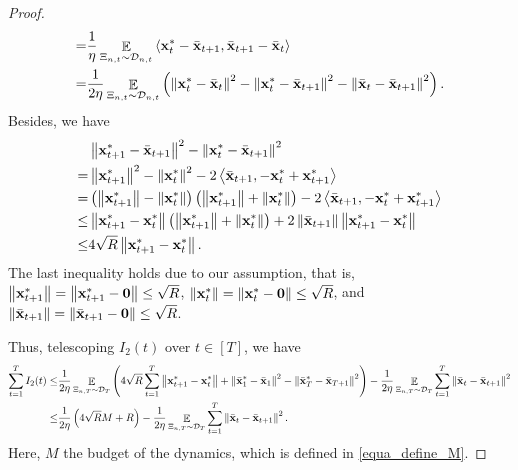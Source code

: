 \documentclass{article}
\begin{document}
\begin{proof}
\begin{align}
= & \frac{1}{\eta}\mathop{\mathbb{E}}_{ \Xi_{n,t} \sim \mathcal{D}_{n,t} }\left\langle {\bf x}_t^\ast - \bar{{\bf x}}_{t+1}, \bar{{\bf x}}_{t+1} - \bar{{\bf x}}_t  \right\rangle \\ \label{equa_I3_temp}
= & \frac{1}{2\eta}\mathop{\mathbb{E}}_{ \Xi_{n,t} \sim \mathcal{D}_{n,t} }\left(  \left\lVert{\bf x}_t^\ast - \bar{{\bf x}}_t\right\rVert^2 - \left\lVert{\bf x}_t^\ast - \bar{{\bf x}}_{t+1}\right\rVert^2 - \left\lVert\bar{{\bf x}}_t - \bar{{\bf x}}_{t+1}\right\rVert^2  \right). 
\end{align} Besides, we have
\begin{align}
\nonumber
& \left\lVert{\bf x}_{t+1}^\ast - \bar{{\bf x}}_{t+1}\right\rVert^2 - \left\lVert{\bf x}_t^\ast - \bar{{\bf x}}_{t+1}\right\rVert^2 \\ \nonumber 
= & \left\lVert{\bf x}_{t+1}^\ast\right\rVert^2 - \left\lVert{\bf x}_t^\ast\right\rVert^2 - 2\left\langle\bar{{\bf x}}_{t+1}, -{\bf x}_t^\ast + {\bf x}_{t+1}^\ast \right\rangle \\ \nonumber
= & \left( \left\lVert{\bf x}_{t+1}^\ast\right\rVert - \left\lVert{\bf x}_t^\ast\right\rVert \right) \left( \left\lVert{\bf x}_{t+1}^\ast\right\rVert + \left\lVert{\bf x}_t^\ast\right\rVert \right) - 2\left\langle\bar{{\bf x}}_{t+1}, -{\bf x}_t^\ast + {\bf x}_{t+1}^\ast \right\rangle \\ \nonumber
\le & \left\lVert{\bf x}_{t+1}^\ast - {\bf x}_t^\ast\right\rVert \left( \left\lVert{\bf x}_{t+1}^\ast\right\rVert + \left\lVert{\bf x}_t^\ast\right\rVert \right) + 2\left\lVert\bar{{\bf x}}_{t+1}\right\rVert \left\lVert{\bf x}_{t+1}^\ast-{\bf x}_t^\ast\right\rVert \\ \nonumber
\le & 4\sqrt{R}\left\lVert{\bf x}_{t+1}^\ast - {\bf x}_t^\ast\right\rVert.   
\end{align} The last inequality holds due to our assumption, that is, $\left\lVert{\bf x}_{t+1}^\ast\right\rVert=\left\lVert{\bf x}_{t+1}^\ast - {\bf 0}\right\rVert\le \sqrt{R}$, $\left\lVert{\bf x}_t^\ast\right\rVert = \left\lVert{\bf x}_t^\ast-{\bf 0}\right\rVert \le \sqrt{R}$, and $\left\lVert\bar{{\bf x}}_{t+1}\right\rVert = \left\lVert\bar{{\bf x}}_{t+1}-{\bf 0}\right\rVert \le \sqrt{R}$. 

Thus, telescoping $I_2(t)$ over $t\in[T]$, we have 
\begin{align}
\nonumber
\sum_{t=1}^T I_2(t) \le & \frac{1}{2\eta}\mathop{\mathbb{E}}_{ \Xi_{n,T} \sim \mathcal{D}_{T} }\left(  4\sqrt{R}\sum_{t=1}^T\left\lVert{\bf x}_{t+1}^\ast - {\bf x}_t^\ast\right\rVert + \left\lVert\bar{{\bf x}}_1^\ast - \bar{{\bf x}}_1\right\rVert^2 - \left\lVert\bar{{\bf x}}_T^\ast - \bar{{\bf x}}_{T+1}\right\rVert^2  \right) - \frac{1}{2\eta} \mathop{\mathbb{E}}_{ \Xi_{n,T} \sim \mathcal{D}_{T} }\sum_{t=1}^T \left\lVert\bar{{\bf x}}_t - \bar{{\bf x}}_{t+1}\right\rVert^2 \\ \nonumber
\le & \frac{1}{2\eta}\left(  4\sqrt{R} M + R  \right) - \frac{1}{2\eta} \mathop{\mathbb{E}}_{ \Xi_{n,T} \sim \mathcal{D}_{T} } \sum_{t=1}^T \left\lVert\bar{{\bf x}}_t - \bar{{\bf x}}_{t+1} \right\rVert^2.
\end{align} Here, $M$ the budget of the dynamics, which is defined in \eqref{equa_define_M}.


\end{proof}
\end{document}
